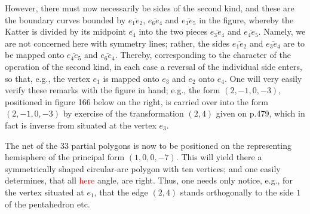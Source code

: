 However, there must now necessarily be sides of the second kind, and these are the boundary curves bounded by $\overline{e_1e_2}$, $\overline{e_6e_4}$ and $\overline{e_3e_5}$ in the figure, whereby the Katter is divided by its midpoint $\overline{e_4}$ into the two pieces $\overline{e_3e_4}$ and $\overline{e_4e_5}$. Namely, we are not concerned here with symmetry lines; rather, the sides $\overline{e_1e_2}$ and $\overline{e_3e_4}$ are to be mapped onto $\overline{e_4e_5}$ and $\overline{e_6e_4}$. Thereby, corresponding to the character of the operation of the second kind, in each case a reversal of the individual side enters, so that, e.g., the vertex $e_1$ is mapped onto $e_3$ and $e_2$ onto $e_4$. One will very easily verify these remarks with the figure in hand; e.g., the form $(2,-1,0,-3)$, positioned in figure 166 below on the right, is carried over into the form $(2,-1,0,-3)$ by exercise of the transformation $(2,4)$ given on p.479, which in fact is inverse from situated at the vertex $e_3$.

The net of the 33 partial polygons is now to be positioned on the representing hemisphere of the principal form $(1,0,0,-7)$. This will yield there a symmetrically shaped circular-arc polygon with ten vertices; and one easily determines, that all \textcolor{red}{here} angle, are right. Thus, one needs only notice, e.g., for the vertex situated at $e_1$, that the edge $(2,4)$ stands orthogonally to the side $\mathrm{1}$ of the pentahedron etc.

